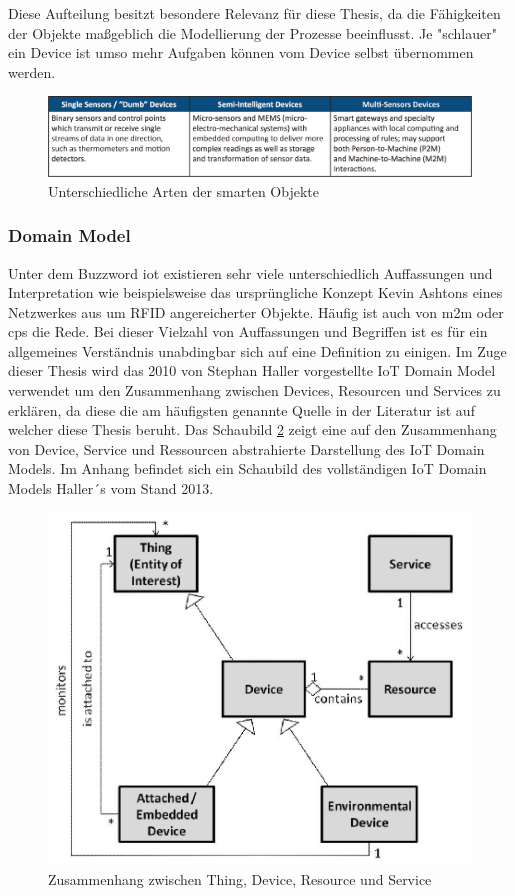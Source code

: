 \documentclass[a4paper, 12pt, twoside, headsepline=true]{scrartcl} %
\begin{document}
Diese Aufteilung besitzt besondere Relevanz für diese Thesis, da die Fähigkeiten der Objekte maßgeblich die Modellierung der Prozesse beeinflusst. Je "schlauer" ein Device ist umso mehr Aufgaben können vom Device selbst übernommen werden.

\begin{figure}[H]
	\includegraphics[height=3 cm,keepaspectratio,center]{figures/iotDevices}
	\caption{Unterschiedliche Arten der smarten Objekte \cite{iotdevices}}
	\label{iotdevices}
\end{figure}

\subsubsection{Domain Model}\label{sec:DomainModel}
Unter dem Buzzword \ac{iot} existieren sehr viele unterschiedlich Auffassungen und Interpretation wie beispielsweise das ursprüngliche Konzept Kevin Ashtons eines Netzwerkes aus um RFID angereicherter Objekte. Häufig ist auch von \ac{m2m} oder \ac{cps} die Rede. Bei dieser Vielzahl von Auffassungen und Begriffen ist es für ein allgemeines Verständnis unabdingbar sich auf eine Definition zu einigen. Im Zuge dieser Thesis wird das 2010 von Stephan Haller vorgestellte IoT Domain Model verwendet um den Zusammenhang zwischen Devices, Resourcen und Services zu erklären\cite{haller2010things}, da diese die am häufigsten genannte Quelle in der Literatur ist auf welcher diese Thesis beruht. Das Schaubild \ref{domainmodel} zeigt eine auf den Zusammenhang von Device, Service und Ressourcen abstrahierte Darstellung des IoT Domain Models. Im Anhang befindet sich ein Schaubild des vollständigen IoT Domain Models Haller´s vom Stand 2013.

\begin{figure}[H]
	\includegraphics[height=8 cm,keepaspectratio,center]{figures/domainmodel}
	\caption{Zusammenhang zwischen Thing, Device, Resource und Service \cite{haller2010things}}
	\label{domainmodel}
\end{figure}
\end{document}
